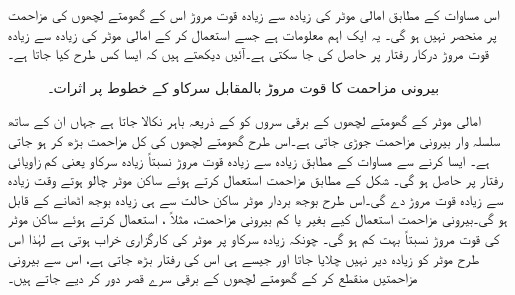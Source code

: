 اس مساوات کے مطابق امالی موٹر کی زیادہ سے زیادہ قوت مروڑ اس کے گھومتے لچھوں کی  مزاحمت پر منحصر نہیں ہو گی۔ یہ ایک اہم معلومات ہے جسے استعمال کر کے امالی موٹر کی زیادہ سے زیادہ قوت مروڑ درکار رفتار پر  حاصل کی جا سکتی ہے۔آئیں دیکھتے ہیں کہ ایسا کس طرح کیا جاتا ہے۔
\begin{figure}
\centering
%
\caption{بیرونی مزاحمت  کا قوت مروڑ بالمقابل سرکاو کے خطوط پر اثرات۔}
\label{شکل_امالی_بیرونی_مزاحمت_اور_مروٹ}
\end{figure}

امالی موٹر کے گھومتے لچھوں کے برقی سروں کو  کے ذریعہ باہر نکالا جاتا ہے جہاں ان کے ساتھ سلسلہ وار بیرونی مزاحمت جوڑی جاتی ہے۔اس طرح گھومتے لچھوں کی کل مزاحمت بڑھ کر  ہو جاتی ہے۔ ایسا کرنے سے مساوات   کے مطابق زیادہ سے زیادہ قوت مروڑ نسبتاً زیادہ سرکاو یعنی کم زاویائی رفتار پر حاصل ہو گی۔ شکل  کے مطابق مزاحمت  استعمال کرتے ہوئے ساکن موٹر چالو ہوتے  وقت زیادہ سے زیادہ قوت مروڑ دے گی۔اس طرح بوجھ بردار موٹر ساکن حالت سے ہی زیادہ بوجھ اٹھانے کے قابل ہو گی۔بیرونی مزاحمت استعمال کیے بغیر یا کم بیرونی مزاحمت، مثلاً ، استعمال کرتے ہوئے ساکن موٹر کی قوت مروڑ نسبتاً بہت کم ہو گی۔  چونکہ زیادہ سرکاو پر موٹر کی کارگزاری خراب ہوتی ہے لہٰذا اس طرح موٹر کو زیادہ دیر نہیں چلایا جاتا اور جیسے ہی اس کی رفتار بڑھ جاتی ہے، اس سے  بیرونی مزاحمتیں منقطع کر کے گھومتے لچھوں کے برقی سرے قصر دور کر دیے جاتے ہیں۔

